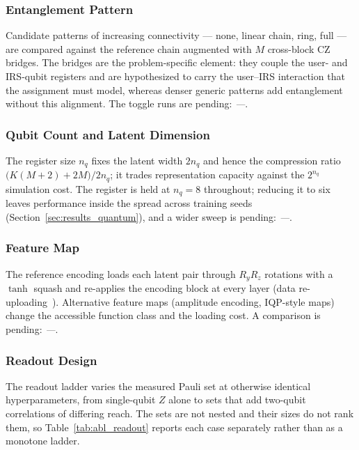 \documentclass[12pt,onecolumn]{IEEEtran}
\begin{document}
\subsubsection{Entanglement Pattern}
Candidate patterns of increasing connectivity --- none, linear chain, ring, full --- are compared against the reference chain augmented with $M$ cross-block CZ bridges. The bridges are the problem-specific element: they couple the user- and IRS-qubit registers and are hypothesized to carry the user--IRS interaction that the assignment must model, whereas denser generic patterns add entanglement without this alignment. The toggle runs are pending: \emph{---}.

\subsubsection{Qubit Count and Latent Dimension}
The register size $n_q$ fixes the latent width $2n_q$ and hence the compression ratio $\bigl(K(M{+}2){+}2M\bigr)/2n_q$; it trades representation capacity against the $2^{n_q}$ simulation cost. The register is held at $n_q{=}8$ throughout; reducing it to six leaves performance inside the spread across training seeds (Section~\ref{sec:results_quantum}), and a wider sweep is pending: \emph{---}.

\subsubsection{Feature Map}
The reference encoding loads each latent pair through $R_y R_z$ rotations with a $\tanh$ squash and re-applies the encoding block at every layer (data re-uploading~\cite{perez2020data}). Alternative feature maps (amplitude encoding, IQP-style maps) change the accessible function class and the loading cost. A comparison is pending: \emph{---}.

\subsubsection{Readout Design}
The readout ladder varies the measured Pauli set at otherwise identical hyperparameters, from single-qubit $Z$ alone to sets that add two-qubit correlations of differing reach. The sets are not nested and their sizes do not rank them, so Table~\ref{tab:abl_readout} reports each case separately rather than as a monotone ladder.
\end{document}
